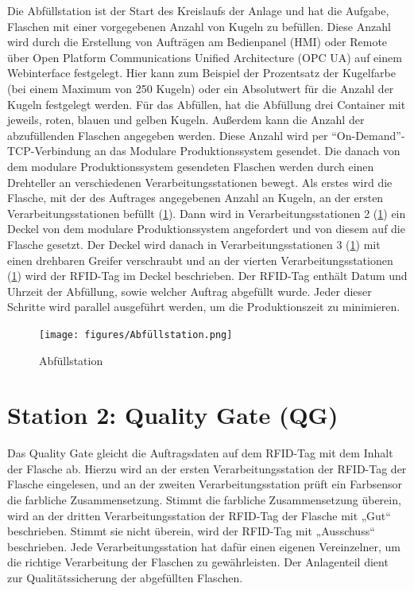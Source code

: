 Die Abfüllstation ist der Start des Kreislaufs der Anlage und hat die Aufgabe, Flaschen mit einer vorgegebenen Anzahl von Kugeln zu befüllen. 
Diese Anzahl wird durch 
die Erstellung von Aufträgen am Bedienpanel (HMI) oder Remote über Open Platform Communications Unified Architecture (OPC UA) auf einem 
Webinterface festgelegt. Hier kann zum Beispiel der Prozentsatz der Kugelfarbe (bei einem Maximum 
von 250 Kugeln) oder ein Absolutwert für die Anzahl der Kugeln festgelegt werden. Für das Abfüllen, hat die Abfüllung drei 
Container mit jeweils, roten, blauen und gelben Kugeln. Außerdem kann die Anzahl der abzufüllenden Flaschen angegeben 
werden. Diese Anzahl wird per ``On-Demand''-TCP-Verbindung an das Modulare Produktionssystem gesendet. Die danach von dem 
modulare Produktionssystem gesendeten Flaschen werden durch einen Drehteller an verschiedenen Verarbeitungsstationen bewegt. 
Als erstes wird die Flasche, mit der des Auftrages angegebenen Anzahl an Kugeln, an der ersten Verarbeitungsstationen befüllt 
(\ref{fig:Abfüllung}). Dann wird in Verarbeitungsstationen 2 (\ref{fig:Abfüllung}) ein Deckel von dem modulare 
Produktionssystem angefordert und von diesem auf die Flasche gesetzt. Der Deckel wird danach in Verarbeitungsstationen 3 
(\ref{fig:Abfüllung}) mit einen drehbaren Greifer verschraubt 
und an der vierten Verarbeitungsstationen (\ref{fig:Abfüllung}) wird der RFID-Tag im Deckel beschrieben. Der RFID-Tag enthält Datum und Uhrzeit der Abfüllung, sowie welcher 
Auftrag abgefüllt wurde. Jeder dieser Schritte wird parallel ausgeführt werden, um die Produktionszeit zu minimieren.

\begin{figure}[h!]
    \centering
    \texttt{[image: figures/Abfüllstation.png]}
    \caption{Abfüllstation\cite{siemens2022}} %
    \label{fig:Abfüllung} %
\end{figure}
\FloatBarrier
\section{Station 2: Quality Gate (QG)}\label{sec:Station 3: Quality Gate}

Das Quality Gate gleicht die Auftragsdaten auf dem RFID-Tag mit dem Inhalt der Flasche ab. Hierzu wird an der ersten Verarbeitungsstation der 
RFID-Tag der Flasche eingelesen, und an der zweiten Verarbeitungsstation prüft ein Farbsensor die farbliche Zusammensetzung. Stimmt die farbliche 
Zusammensetzung überein, wird an der dritten Verarbeitungsstation der RFID-Tag der Flasche mit „Gut“ beschrieben. Stimmt sie nicht überein, 
wird der RFID-Tag mit „Ausschuss“ beschrieben. Jede Verarbeitungsstation hat dafür einen eigenen Vereinzelner, um die richtige Verarbeitung der 
Flaschen zu gewährleisten. Der Anlagenteil dient zur Qualitätssicherung der abgefüllten Flaschen.

